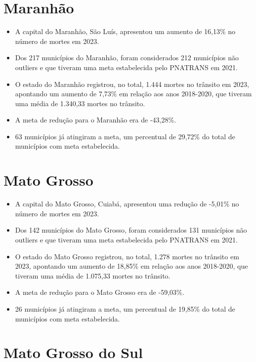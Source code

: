 \documentclass[
  letterpaper,
  DIV=11,
  numbers=noendperiod]{scrreprt}
\begin{document}
\section{Maranhão}\label{maranhuxe3o}

\begin{itemize}
\item
  A capital do Maranhão, São Luís, apresentou um aumento de 16,13\% no
  número de mortes em 2023.
\item
  Dos 217 municípios do Maranhão, foram considerados 212 municípios não
  outliers e que tiveram uma meta estabelecida pelo PNATRANS em 2021.
\item
  O estado do Maranhão registrou, no total, 1.444 mortes no trânsito em
  2023, apontando um aumento de 7,73\% em relação aos anos 2018-2020,
  que tiveram uma média de 1.340,33 mortes no trânsito.
\item
  A meta de redução para o Maranhão era de -43,28\%.
\item
  63 municípios já atingiram a meta, um percentual de 29,72\% do total
  de municípios com meta estabelecida.
\end{itemize}

\section{Mato Grosso}\label{mato-grosso}

\begin{itemize}
\item
  A capital do Mato Grosso, Cuiabá, apresentou uma redução de -5,01\% no
  número de mortes em 2023.
\item
  Dos 142 municípios do Mato Grosso, foram considerados 131 municípios
  não outliers e que tiveram uma meta estabelecida pelo PNATRANS em
  2021.
\item
  O estado do Mato Grosso registrou, no total, 1.278 mortes no trânsito
  em 2023, apontando um aumento de 18,85\% em relação aos anos
  2018-2020, que tiveram uma média de 1.075,33 mortes no trânsito.
\item
  A meta de redução para o Mato Grosso era de -59,03\%.
\item
  26 municípios já atingiram a meta, um percentual de 19,85\% do total
  de municípios com meta estabelecida.
\end{itemize}

\section{Mato Grosso do Sul}\label{mato-grosso-do-sul}
\end{document}
